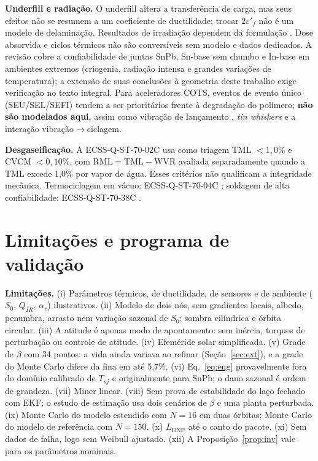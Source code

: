 \documentclass[12pt,a4paper]{article}
\newcommand{\LDNP}{L_{\mathrm{DNP}}}
\begin{document}
\textbf{Underfill e radiação.} O underfill altera a transferência de carga, mas
seus efeitos não se resumem a um coeficiente de ductilidade; trocar
$2\varepsilon'_f$ não é um modelo de delaminação. Resultados de irradiação
dependem da formulação \cite{wang2024,zimmermann2022}. Dose absorvida e ciclos
térmicos não são conversíveis sem modelo e dados dedicados. A revisão
\cite{guan2023} cobre a confiabilidade de juntas SnPb, Sn-base sem chumbo e
In-base em ambientes extremos (criogenia, radiação intensa e grandes variações
de temperatura); a extensão de suas conclusões à geometria deste trabalho exige
verificação no texto integral. Para aceleradores COTS, eventos de evento único
(SEU/SEL/SEFI) tendem a ser prioritários frente à degradação do polímero;
\textbf{não são modelados aqui}, assim como vibração de lançamento \cite{gevs},
\emph{tin whiskers} e a interação vibração$\rightarrow$ciclagem.

\textbf{Desgaseificação.} A ECSS-Q-ST-70-02C \cite{ecss7002} usa como triagem
TML $<1{,}0\%$ e CVCM $<0{,}10\%$, com $\mathrm{RML}=\mathrm{TML}-\mathrm{WVR}$
avaliada separadamente quando a TML excede 1,0\% por vapor de água. Esses
critérios não qualificam a integridade mecânica. Termociclagem em vácuo:
ECSS-Q-ST-70-04C \cite{ecss7004}; soldagem de alta confiabilidade:
ECSS-Q-ST-70-38C \cite{ecss7038}.

\section{Limitações e programa de validação}
\textbf{Limitações.} (i) Parâmetros térmicos, de ductilidade, de sensores e de
ambiente ($S_0$, $Q_{IR}$, $\alpha_r$) ilustrativos. (ii) Modelo de dois nós,
sem gradientes locais, albedo, penumbra, arrasto nem variação sazonal de $S_0$;
sombra cilíndrica e órbita circular. (iii) A atitude é apenas modo de
apontamento: sem inércia, torques de perturbação ou controle de atitude.
(iv) Efeméride solar simplificada. (v) Grade de $\beta$ com 34 pontos: a vida
ainda variava ao refinar (Seção~\ref{sec:ext}), e a grade do Monte Carlo difere
da fina em até 5,7\%. (vi) Eq.~\ref{eq:eng} provavelmente fora do domínio
calibrado de $T_{sj}$ e originalmente para SnPb; o dano sazonal é ordem de
grandeza. (vii) Miner linear. (viii) Sem prova de estabilidade do laço fechado
com EKF; o estudo de estimação usa dois cenários de $\beta$ e uma planta
perturbada. (ix) Monte Carlo do modelo estendido com $N=16$ em duas órbitas;
Monte Carlo do modelo de referência com $N=150$. (x) $\LDNP$ até o canto do
pacote. (xi) Sem dados de falha, logo sem Weibull ajustado. (xii) A
Proposição~\ref{prop:inv} vale para os parâmetros nominais.
\end{document}
